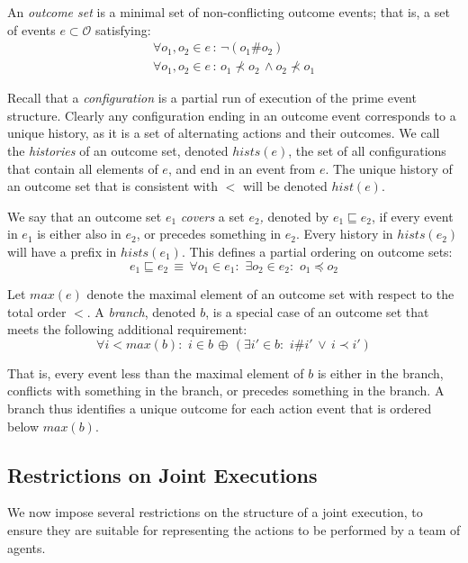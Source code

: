 An \emph{outcome set} is a minimal set of non-conflicting outcome
events; that is, a set of events $e\subset\mathcal{O}$ satisfying:\begin{gather*}
\forall o_{1},o_{2}\in e\,:\,\neg(o_{1}\#o_{2})\\
\forall o_{1},o_{2}\in e\,:\, o_{1}\not\prec o_{2}\,\wedge o_{2}\not\prec o_{1}\end{gather*}


Recall that a \emph{configuration} is a partial run of execution of
the prime event structure. Clearly any configuration ending in an
outcome event corresponds to a unique history, as it is a set of alternating
actions and their outcomes. We call the \emph{histories} of an outcome
set, denoted $hists(e)$, the set of all configurations that contain
all elements of $e$, and end in an event from $e$. The unique history
of an outcome set that is consistent with $<$ will be denoted $hist(e)$.

We say that an outcome set $e_{1}$ \emph{covers }a set \emph{$e_{2}$,
}denoted by $e_{1}\sqsubseteq e_{2}$, if every event in $e_{1}$
is either also in $e_{2}$, or precedes something in $e_{2}$. Every
history in $hists(e_{2})$ will have a prefix in $hists(e_{1})$.
This defines a partial ordering on outcome sets:\[
e_{1}\sqsubseteq e_{2}\,\equiv\,\forall o_{1}\in e_{1}:\,\,\exists o_{2}\in e_{2}:\,\, o_{1}\preceq o_{2}\]


Let $max(e)$ denote the maximal element of an outcome set with respect
to the total order $<$. A \emph{branch}, denoted $b$, is a special
case of an outcome set that meets the following additional requirement:\[
\forall i<max(b):\,\, i\in b\,\oplus\,(\exists i'\in b:\,\, i\#i'\,\vee\, i\prec i')\]


That is, every event less than the maximal element of $b$ is either
in the branch, conflicts with something in the branch, or precedes
something in the branch. A branch thus identifies a unique outcome
for each action event that is ordered below $max(b)$.


\subsection{Restrictions on Joint Executions}

\label{sub:Restrictions}

We now impose several restrictions on the structure of a joint execution,
to ensure they are suitable for representing the actions to be performed
by a team of agents.\\


